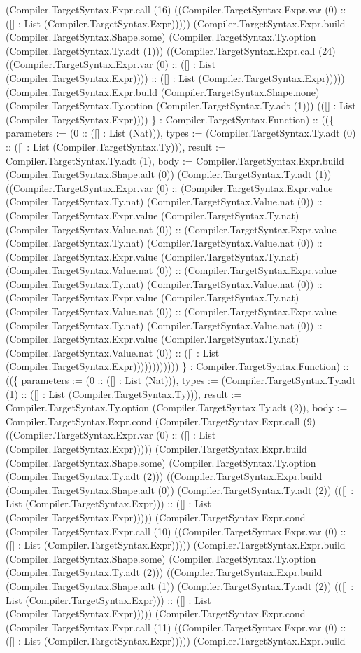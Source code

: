 \documentclass[11pt]{article}
\begin{document}
(Compiler.TargetSyntax.Expr.call (16) ((Compiler.TargetSyntax.Expr.var (0) :: ([] : List (Compiler.TargetSyntax.Expr))))) (Compiler.TargetSyntax.Expr.build (Compiler.TargetSyntax.Shape.some) (Compiler.TargetSyntax.Ty.option (Compiler.TargetSyntax.Ty.adt (1))) ((Compiler.TargetSyntax.Expr.call (24) ((Compiler.TargetSyntax.Expr.var (0) :: ([] : List (Compiler.TargetSyntax.Expr)))) :: ([] : List (Compiler.TargetSyntax.Expr))))) (Compiler.TargetSyntax.Expr.build (Compiler.TargetSyntax.Shape.none) (Compiler.TargetSyntax.Ty.option (Compiler.TargetSyntax.Ty.adt (1))) (([] : List (Compiler.TargetSyntax.Expr)))) \} : Compiler.TargetSyntax.Function) :: ((\{ parameters := (0 :: ([] : List (Nat))), types := (Compiler.TargetSyntax.Ty.adt (0) :: ([] : List (Compiler.TargetSyntax.Ty))), result := Compiler.TargetSyntax.Ty.adt (1), body := Compiler.TargetSyntax.Expr.build (Compiler.TargetSyntax.Shape.adt (0)) (Compiler.TargetSyntax.Ty.adt (1)) ((Compiler.TargetSyntax.Expr.var (0) :: (Compiler.TargetSyntax.Expr.value (Compiler.TargetSyntax.Ty.nat) (Compiler.TargetSyntax.Value.nat (0)) :: (Compiler.TargetSyntax.Expr.value (Compiler.TargetSyntax.Ty.nat) (Compiler.TargetSyntax.Value.nat (0)) :: (Compiler.TargetSyntax.Expr.value (Compiler.TargetSyntax.Ty.nat) (Compiler.TargetSyntax.Value.nat (0)) :: (Compiler.TargetSyntax.Expr.value (Compiler.TargetSyntax.Ty.nat) (Compiler.TargetSyntax.Value.nat (0)) :: (Compiler.TargetSyntax.Expr.value (Compiler.TargetSyntax.Ty.nat) (Compiler.TargetSyntax.Value.nat (0)) :: (Compiler.TargetSyntax.Expr.value (Compiler.TargetSyntax.Ty.nat) (Compiler.TargetSyntax.Value.nat (0)) :: (Compiler.TargetSyntax.Expr.value (Compiler.TargetSyntax.Ty.nat) (Compiler.TargetSyntax.Value.nat (0)) :: (Compiler.TargetSyntax.Expr.value (Compiler.TargetSyntax.Ty.nat) (Compiler.TargetSyntax.Value.nat (0)) :: ([] : List (Compiler.TargetSyntax.Expr)))))))))))) \} : Compiler.TargetSyntax.Function) :: ((\{ parameters := (0 :: ([] : List (Nat))), types := (Compiler.TargetSyntax.Ty.adt (1) :: ([] : List (Compiler.TargetSyntax.Ty))), result := Compiler.TargetSyntax.Ty.option (Compiler.TargetSyntax.Ty.adt (2)), body := Compiler.TargetSyntax.Expr.cond (Compiler.TargetSyntax.Expr.call (9) ((Compiler.TargetSyntax.Expr.var (0) :: ([] : List (Compiler.TargetSyntax.Expr))))) (Compiler.TargetSyntax.Expr.build (Compiler.TargetSyntax.Shape.some) (Compiler.TargetSyntax.Ty.option (Compiler.TargetSyntax.Ty.adt (2))) ((Compiler.TargetSyntax.Expr.build (Compiler.TargetSyntax.Shape.adt (0)) (Compiler.TargetSyntax.Ty.adt (2)) (([] : List (Compiler.TargetSyntax.Expr))) :: ([] : List (Compiler.TargetSyntax.Expr))))) (Compiler.TargetSyntax.Expr.cond (Compiler.TargetSyntax.Expr.call (10) ((Compiler.TargetSyntax.Expr.var (0) :: ([] : List (Compiler.TargetSyntax.Expr))))) (Compiler.TargetSyntax.Expr.build (Compiler.TargetSyntax.Shape.some) (Compiler.TargetSyntax.Ty.option (Compiler.TargetSyntax.Ty.adt (2))) ((Compiler.TargetSyntax.Expr.build (Compiler.TargetSyntax.Shape.adt (1)) (Compiler.TargetSyntax.Ty.adt (2)) (([] : List (Compiler.TargetSyntax.Expr))) :: ([] : List (Compiler.TargetSyntax.Expr))))) (Compiler.TargetSyntax.Expr.cond (Compiler.TargetSyntax.Expr.call (11) ((Compiler.TargetSyntax.Expr.var (0) :: ([] : List (Compiler.TargetSyntax.Expr))))) (Compiler.TargetSyntax.Expr.build 
\end{document}
